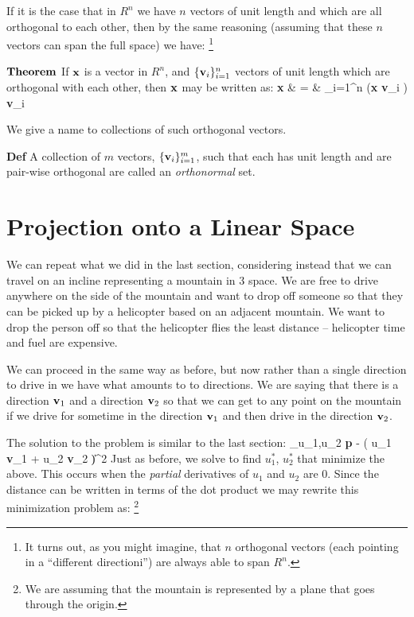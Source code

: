 \documentclass[12pt]{article}
\begin{document}
If it is the case that in $R^n$ we have $n$ vectors of unit length and which 
are all orthogonal to each other, then by the same reasoning 
(assuming that these $n$ vectors can span the full space) we have:%
\footnote{It turns out, as you might imagine, that $n$ orthogonal 
vectors (each pointing in a ``different directioni'') are always able 
to span $R^n$.}

${\bf Theorem}$ If ${\bf x}$ is a vector in $R^n$, and 
$\{{\bf v}_i\}_{i=1}^n$ vectors of unit length which are orthogonal 
with each other, then ${\bf x}$ may be written as:
\be
{\bf x} & = & \sum_{i=1}^n ({\bf x} {\boldsymbol \cdot} {\bf v}_i ) {\bf v}_i  \label{orthonorm_expansion} 
\ee

We give a name to collections of such orthogonal vectors.

{\bf Def} A collection of $m$ vectors, $\{ {\bf v}_i \}_{i=1}^m$, such that each 
has unit length and are pair-wise orthogonal are called an {\em orthonormal\/} set.

\section{Projection onto a Linear Space}

We can repeat what we did in the last section, considering instead that we 
can travel on an incline representing a mountain in 3 space. We are free to 
drive anywhere on the 
side of the mountain and want to drop off someone so that they can be 
picked up by a helicopter based on an adjacent mountain. 
We want to drop the person off so that
the helicopter flies the least distance -- 
helicopter time and fuel are expensive.

We can proceed in the same way as before, but now rather than a single 
direction to drive in we have what amounts to to directions. 
We are saying that there is a direction ${\bf v}_1$ 
and a direction ${\bf v}_2$ so that we can get to any point on the mountain 
if we drive for sometime in the direction ${\bf v}_1$ and then drive in 
the direction ${\bf v}_2$.

The solution to the problem is similar to the last section:
\be
    _{u_1,u_2} \| {\bf p} - \left( u_1 {\bf v}_1 + u_2 {\bf v}_2 \right)\|^2
\ee
Just as before, we solve to find $u_1^*$, $u_2^*$ that minimize the above. 
This occurs when the {\em partial\/} derivatives of $u_1$ and $u_2$ are $0$.
Since the distance can be written in terms of the dot product we may 
rewrite this minimization problem as:%
\footnote{We are assuming that the mountain is represented by a plane that 
goes through the origin.}
\end{document}
